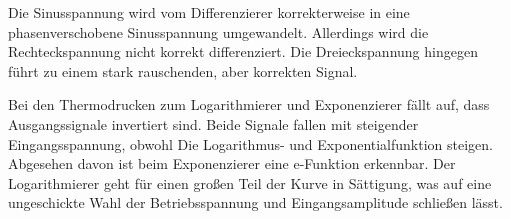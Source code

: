 Die Sinusspannung wird vom Differenzierer korrekterweise in eine phasenverschobene Sinusspannung umgewandelt.
Allerdings wird die Rechteckspannung nicht korrekt differenziert.
Die Dreieckspannung hingegen führt zu einem stark rauschenden, aber korrekten Signal.

Bei den Thermodrucken zum Logarithmierer und Exponenzierer fällt auf, dass Ausgangssignale invertiert sind.
Beide Signale fallen mit steigender Eingangsspannung, obwohl Die Logarithmus- und Exponentialfunktion steigen.
Abgesehen davon ist beim Exponenzierer eine e-Funktion erkennbar.
Der Logarithmierer geht für einen großen Teil der Kurve in Sättigung, was auf eine ungeschickte Wahl der Betriebsspannung und Eingangsamplitude schließen lässt.